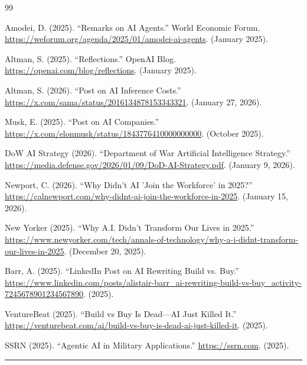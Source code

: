 \documentclass[11pt]{article}
\begin{document}
\begin{thebibliography}{99}

Amodei, D. (2025). ``Remarks on AI Agents.'' World Economic Forum. \url{https://weforum.org/agenda/2025/01/amodei-ai-agents}. (January 2025).

Altman, S. (2025). ``Reflections.'' OpenAI Blog. \url{https://openai.com/blog/reflections}. (January 2025).

Altman, S. (2026). ``Post on AI Inference Costs.'' \url{https://x.com/sama/status/2016134878153343321}. (January 27, 2026).

Musk, E. (2025). ``Post on AI Companies.'' \url{https://x.com/elonmusk/status/1843776410000000000}. (October 2025).

DoW AI Strategy (2026). ``Department of War Artificial Intelligence Strategy.'' \url{https://media.defense.gov/2026/01/09/DoD-AI-Strategy.pdf}. (January 9, 2026).

Newport, C. (2026). ``Why Didn't AI 'Join the Workforce' in 2025?'' \url{https://calnewport.com/why-didnt-ai-join-the-workforce-in-2025}. (January 15, 2026).

New Yorker (2025). ``Why A.I. Didn't Transform Our Lives in 2025.'' \url{https://www.newyorker.com/tech/annals-of-technology/why-a-i-didnt-transform-our-lives-in-2025}. (December 20, 2025).

Barr, A. (2025). ``LinkedIn Post on AI Rewriting Build vs. Buy.'' \url{https://www.linkedin.com/posts/alistair-barr_ai-rewriting-build-vs-buy_activity-7245678901234567890}. (2025).

VentureBeat (2025). ``Build vs Buy Is Dead---AI Just Killed It.'' \url{https://venturebeat.com/ai/build-vs-buy-is-dead-ai-just-killed-it}. (2025).

SSRN (2025). ``Agentic AI in Military Applications.'' \url{https://ssrn.com}. (2025).

\end{thebibliography}

\begin{center}\rule{0.5\linewidth}{0.5pt}\end{center}
\end{document}

